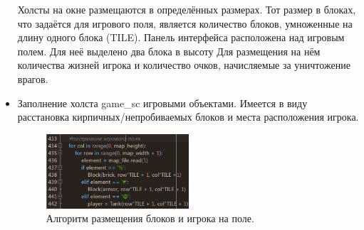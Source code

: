 \begin{itemize}
Холсты на окне размещаются в определённых размерах. Тот размер в блоках, что задаётся для игрового поля, является количество блоков, умноженные на длину одного блока (TILE). Панель интерфейса  расположена над игровым полем. Для неё выделено два блока в высоту Для размещения на нём количества жизней игрока и количество очков, начисляемые за уничтожение врагов. 
\item Заполнение холста game\_sc игровыми объектами. Имеется в виду расстановка кирпичных/непробиваемых блоков и места расположения игрока.
\begin{figure}[h]
    \centering
    \includegraphics[width=0.5\textwidth]{./images/image2.png}
    \caption{\centering\label{fig:example05}Алгоритм размещения блоков и игрока на поле.}
\end{figure}


\end{itemize}
